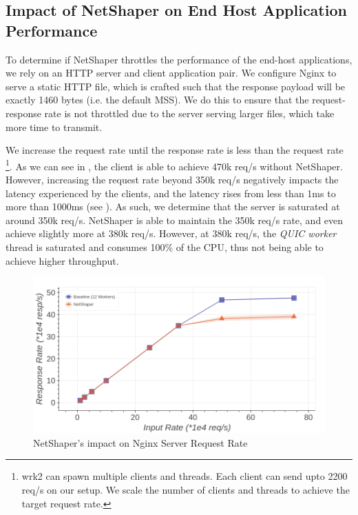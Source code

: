 \subsection{Impact of NetShaper on End Host Application Performance}
\label{subsec:netshaper-evaluation-http-reqs}

To determine if NetShaper throttles the performance of the end-host applications, we rely on an HTTP server and client application pair.
We configure Nginx to serve a static HTTP file, which is crafted such that the response payload will be exactly 1460 bytes (i.e. the default MSS).
We do this to ensure that the request-response rate is not throttled due to the server serving larger files, which take more time to transmit.

We increase the request rate until the response rate is less than the request rate~
\footnote{wrk2 can spawn multiple clients and threads. Each client can send upto 2200 req/s on our setup. We scale the number of clients and threads to achieve the target request rate.}.
As we can see in , the client is able to achieve 470k req/s without NetShaper.
However, increasing the request rate beyond 350k req/s negatively impacts the latency experienced by the clients, and the latency rises from less than 1ms to more than 1000ms (see ).
As such, we determine that the server is saturated at around 350k req/s.
NetShaper is able to maintain the 350k req/s rate, and even achieve slightly more at 380k req/s.
However, at 380k req/s, the \textit{QUIC worker} thread is saturated and consumes 100\% of the CPU, thus not being able to achieve higher throughput.


\begin{figure}[!htb]
    \centering
    \includegraphics[width=\columnwidth]{figures/netshaper/evaluation/http_reqs.png}
    \caption{NetShaper's impact on Nginx Server Request Rate}
    \label{fig:netshaper-eval-http-reqs}
\end{figure}

